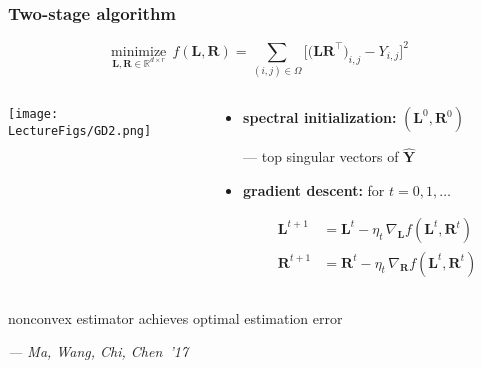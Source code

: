 \documentclass[compress,
mathserif,wide,%
]{beamer}
\begin{document}
\begin{frame}
\frametitle{Two-stage algorithm}

\vspace{-1em}
\[
  \underset{\bm{L},\bm{R}\in \mathbb{R}^{d\times r}}{\text{minimize}}~~ f(\bm{L},\bm{R})= \sum_{(i,j)\in\Omega}\Big[ \big( \bm{L}\bm{R}^{\top} \big)_{i,j} - Y_{i,j} \Big]^{2}
\]


\pause
\vspace{-2em}

\begin{columns}
\begin{column}{0.3\textwidth}

\begin{center}
  \texttt{[image: \\LectureFigs/GD2.png]}
\end{center}

\end{column}



\begin{column}{0.7\textwidth}

\begin{itemize}
\itemsep 1em
\item {\bf spectral initialization:}  $(\bm{L}^{0}, \bm{R}^0)$ 
  
  \quad --- top singular vectors of $\hat{\bm{Y}}$
\item {\bf gradient descent:} for $t=0,1,\ldots $

\vspace{-1.5em}
\begin{align*}
  \bm{L}^{t+1}&= \bm{L}^t- \eta_t \, \nabla_{\bm{L}} f(\bm{L}^t, \bm{R}^t) \\ 
  \bm{R}^{t+1}&= \bm{R}^t- \eta_t \, \nabla_{\bm{R}} f(\bm{L}^t, \bm{R}^t)
\end{align*}
%
\end{itemize}

\end{column}
\end{columns}

\pause
\vspace{-1em}
{

\begin{varblock}[\textwidth]{}
\begin{center}
nonconvex estimator achieves optimal estimation error
\end{center}
\end{varblock}
\hfill {\em \small --- Ma, Wang, Chi, Chen~'17}
}





\end{frame}
\end{document}
